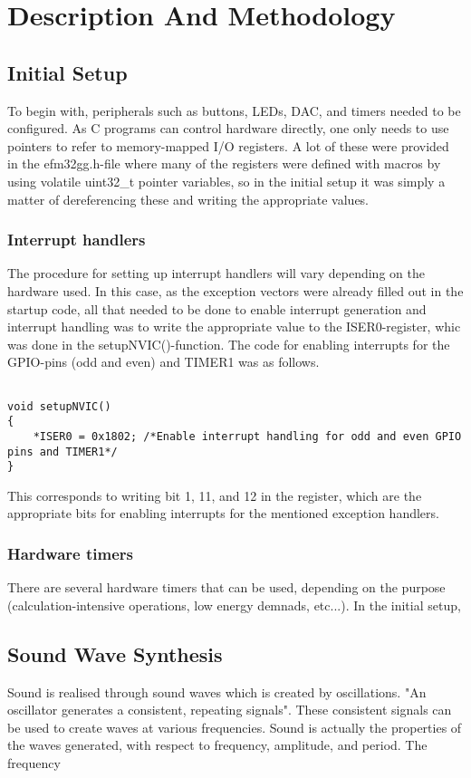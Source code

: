 \section{Description And Methodology}


\subsection{Initial Setup}
To begin with, peripherals such as buttons, LEDs, DAC, and timers needed to be configured. As C programs can control hardware directly, one only needs to use pointers to refer to memory-mapped I/O registers. A lot of these were provided in the efm32gg.h-file where many of the registers were defined with macros by using volatile uint32_t pointer variables, so in the initial setup it was simply a matter of dereferencing these and writing the appropriate values.


\subsubsection{Interrupt handlers}
The procedure for setting up interrupt handlers will vary depending on the hardware used. In this case, as the exception vectors were already filled out in the startup code, all that needed to be done to enable interrupt generation and interrupt handling was to write the appropriate value to the ISER0-register, whic was done in the setupNVIC()-function. The code for enabling interrupts for the GPIO-pins (odd and even) and TIMER1 was as follows. 

\begin{lstlisting}

void setupNVIC()
{
 	*ISER0 = 0x1802; /*Enable interrupt handling for odd and even GPIO pins and TIMER1*/
}

\end{lstlisting} 
This corresponds to writing bit 1, 11, and 12 in the register, which are the appropriate bits for enabling interrupts for the mentioned exception handlers.

\subsubsection{Hardware timers}
There are several hardware timers that can be used, depending on the purpose (calculation-intensive operations, low energy demnads, etc...). In the initial setup, 


\subsection{Sound Wave Synthesis}
Sound is realised through sound waves which is created by oscillations. "An oscillator generates a consistent, repeating signals". These consistent signals can be used to create waves at various frequencies. Sound is actually the properties of the waves generated, with respect to frequency, amplitude, and period. The frequency 

